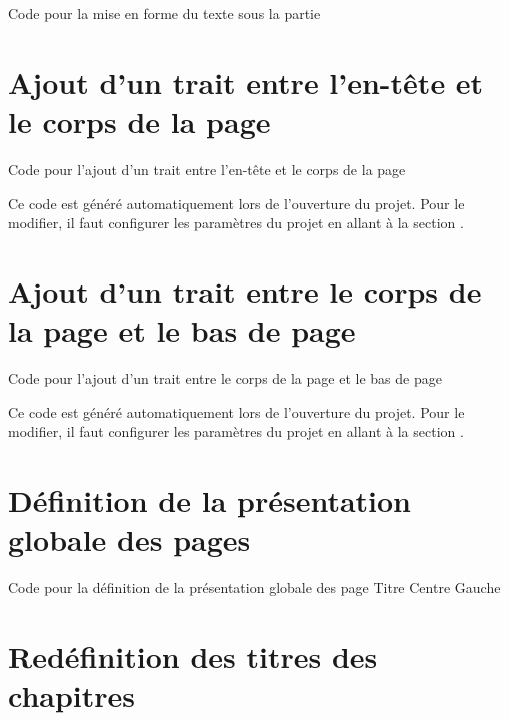 {

\begin{Latex}{Code pour la mise en forme du texte sous la partie}
\end{Latex}


\section{Ajout d'un trait entre l'en-tête et le corps de la page}

\begin{Latex}{Code pour l'ajout d'un trait entre l'en-tête et le corps de la page}
\end{Latex}

Ce code est généré automatiquement lors de l'ouverture du projet. Pour le modifier, il faut configurer les paramètres du projet en allant à la section .

\section{Ajout d'un trait entre le corps de la page et le bas de page}

\begin{Latex}{Code pour l'ajout d'un trait entre le corps de la page et le bas de page}
\end{Latex}

Ce code est généré automatiquement lors de l'ouverture du projet. Pour le modifier, il faut configurer les paramètres du projet en allant à la section .



\section{Définition de la présentation globale des pages}

\begin{Latex}{Code pour la définition de la présentation globale des page}
  \addPresentation
  {Titre} {Centre} {\currentChapter}
  {Gauche} {} {\currentPage}
\end{Latex}

\section{Redéfinition des titres des chapitres}

}

